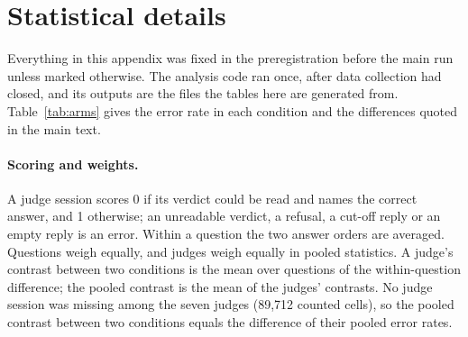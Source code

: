 
\section{Statistical details}
\label{app:stats}

Everything in this appendix was fixed in the preregistration before the main run unless marked otherwise. The analysis
code ran once, after data collection had closed, and its outputs are the files the tables here are generated from.
Table~\ref{tab:arms} gives the error rate in each condition and the differences quoted in the main text.

\begin{table}[h]
\centering
\caption{Judge error by condition (left) and differences in percentage points (right), averaged over seven judges.}
\label{tab:arms}
\footnotesize
\setlength{\tabcolsep}{4pt}
\begin{minipage}[t]{0.5\linewidth}\raggedright

\end{minipage}\hfill
\begin{minipage}[t]{0.48\linewidth}\raggedleft

\end{minipage}
\end{table}

\paragraph{Scoring and weights.} A judge session scores 0 if its verdict could be read and names the correct answer,
and 1 otherwise; an unreadable verdict, a refusal, a cut-off reply or an empty reply is an error. Within a question
the two answer orders are averaged. Questions weigh equally, and judges weigh equally in pooled statistics. A
judge's contrast between two conditions is the mean over questions of the within-question difference; the pooled
contrast is the mean of the judges' contrasts. No judge session was missing among the seven judges (89,712 counted
cells), so the pooled contrast between two conditions equals the difference of their pooled error rates.

